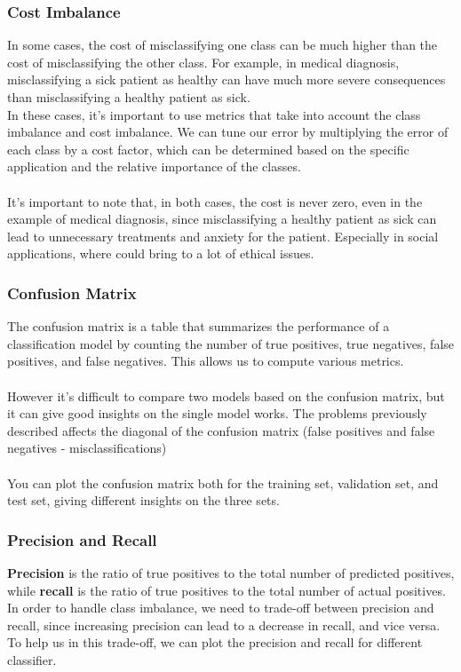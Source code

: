 \subsubsection{Cost Imbalance}
In some cases, the cost of misclassifying one class can be much higher than the cost of misclassifying the other class.
For example, in medical diagnosis, misclassifying a sick patient as healthy can have much more severe consequences than misclassifying a healthy patient as sick.
\\
In these cases, it's important to use metrics that take into account the class imbalance and cost imbalance.
We can tune our error by multiplying the error of each class by a cost factor, which can be determined based on the specific application and the relative importance of the classes.
\\\\
It's important to note that, in both cases, the cost is never zero, even in the example of medical diagnosis, since misclassifying a healthy patient as sick can lead to unnecessary treatments and anxiety for the patient.
Especially in social applications, where could bring to a lot of ethical issues.

\subsubsection{Confusion Matrix}
The confusion matrix is a table that summarizes the performance of a classification model by counting the number of true positives, true negatives, false positives, and false negatives.
This allows us to compute various metrics.
\\\\
However it's difficult to compare two models based on the confusion matrix, but it can give good insights on the single model works.
The problems previously described affects the diagonal of the confusion matrix (false positives and false negatives - misclassifications) %
\\\\
You can plot the confusion matrix both for the training set, validation set, and test set, giving different insights on the three sets.

\subsubsection{Precision and Recall}
\textbf{Precision} is the ratio of true positives to the total number of predicted positives, while \textbf{recall} is the ratio of true positives to the total number of actual positives.
In order to handle class imbalance, we need to trade-off between precision and recall, since increasing precision can lead to a decrease in recall, and vice versa.
\\
To help us in this trade-off, we can plot the precision and recall for different classifier.

